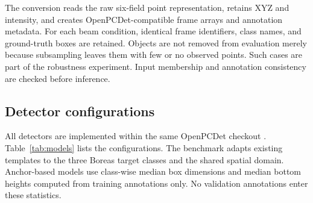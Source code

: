 \documentclass[10pt,twocolumn]{article}
\begin{document}
The conversion reads the raw six-field point representation, retains XYZ and intensity, and creates OpenPCDet-compatible frame arrays and annotation metadata. For each beam condition, identical frame identifiers, class names, and ground-truth boxes are retained. Objects are not removed from evaluation merely because subsampling leaves them with few or no observed points. Such cases are part of the robustness experiment. Input membership and annotation consistency are checked before inference.

\subsection{Detector configurations}
All detectors are implemented within the same OpenPCDet checkout \cite{openpcdet2020}. Table~\ref{tab:models} lists the configurations. The benchmark adapts existing templates to the three Boreas target classes and the shared spatial domain. Anchor-based models use class-wise median box dimensions and median bottom heights computed from training annotations only. No validation annotations enter these statistics.

\begin{table}[t]
\centering\small
\caption{Evaluated configurations. The table describes this checkout, not every variant of the corresponding published model. Spatial cell sizes are in meters. The last column describes the benchmark's principal prediction path.}
\label{tab:models}
\end{table}
\end{document}

